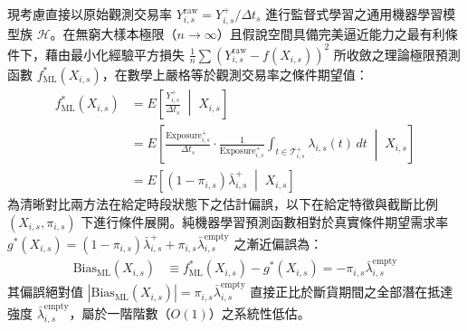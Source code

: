 現考慮直接以原始觀測交易率 $Y^{\text{raw}}_{i,s} = Y^+_{i,s} / \Delta t_s$ 進行監督式學習之通用機器學習模型族 $\mathcal{H}$。在無窮大樣本極限（$n \to \infty$）且假說空間具備完美逼近能力之最有利條件下，藉由最小化經驗平方損失 $\frac{1}{n}\sum (Y^{\text{raw}}_{i,s} - f(X_{i,s}))^2$ 所收斂之理論極限預測函數 $f^*_{\text{ML}}(X_{i,s})$，在數學上嚴格等於觀測交易率之條件期望值：
\begin{equation}
\begin{aligned}
f^*_{\text{ML}}(X_{i,s}) &= E\left[ \frac{Y^+_{i,s}}{\Delta t_s} \;\middle|\; X_{i,s} \right] \\
&= E\left[ \frac{\text{Exposure}^+_{i,s}}{\Delta t_s} \cdot \frac{1}{\text{Exposure}^+_{i,s}} \int_{t \in \mathcal{T}^+_{i,s}} \lambda_{i,s}(t) \, dt \;\middle|\; X_{i,s} \right] \\
&= E\left[ (1 - \pi_{i,s}) \bar{\lambda}^+_{i,s} \;\middle|\; X_{i,s} \right]
\end{aligned}
\end{equation}
為清晰對比兩方法在給定時段狀態下之估計偏誤，以下在給定特徵與截斷比例 $(X_{i,s}, \pi_{i,s})$ 下進行條件展開。純機器學習預測函數相對於真實條件期望需求率 $g^*(X_{i,s}) = (1 - \pi_{i,s})\bar{\lambda}^+_{i,s} + \pi_{i,s}\bar{\lambda}^{\text{empty}}_{i,s}$ 之漸近偏誤為：
\begin{align}
\text{Bias}_{\text{ML}}(X_{i,s}) &\equiv f^*_{\text{ML}}(X_{i,s}) - g^*(X_{i,s}) = -\pi_{i,s} \bar{\lambda}^{\text{empty}}_{i,s}
\end{align}
其偏誤絕對值 $\left|\text{Bias}_{\text{ML}}(X_{i,s})\right| = \pi_{i,s} \bar{\lambda}^{\text{empty}}_{i,s}$ 直接正比於斷貨期間之全部潛在抵達強度 $\bar{\lambda}^{\text{empty}}_{i,s}$，屬於一階階數（$O(1)$）之系統性低估。

